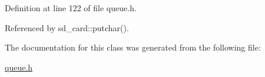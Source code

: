 Definition at line 122 of file queue.\-h.



Referenced by sd\-\_\-card\-::putchar().



The documentation for this class was generated from the following file\-:\begin{DoxyCompactItemize}
\item 
\hyperlink{queue_8h}{queue.\-h}\end{DoxyCompactItemize}
